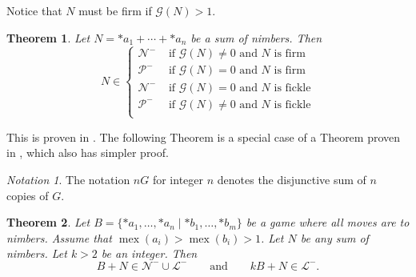 \documentclass{amsart}
\theoremstyle{plain}
\newtheorem{thm}{Theorem}
\theoremstyle{definition}
\theoremstyle{remark}
\newtheorem*{notn}{Notation}
\numberwithin{equation}{section}
\numberwithin{thm}{section}
\DeclareMathOperator{\mex}{mex}
\begin{document}
Notice that $N$ must be firm if $\mathcal{G}(N) > 1$.
\begin{thm}
    \label{nim_strategy}
    Let $N = *a_1 + \cdots +  *a_n $ be a sum of nimbers. Then \begin{equation*}
        N \in \begin{cases}
            \mathcal{N^-} & \text{ if } \mathcal{G}(N) \neq 0 \text{ and }N\text{ is firm} \\
             \mathcal{P^-} & \text{ if } \mathcal{G}(N) = 0 \text{ and }N\text{ is firm}  \\
              \mathcal{N^-} & \text{ if } \mathcal{G}(N)  = 0 \text{ and } N\text{ is fickle}\\
               \mathcal{P^-} & \text{ if } \mathcal{G}(N) \neq 0 \text{ and } N\text{ is fickle}\\
        \end{cases} 
        \end{equation*}
\end{thm}
  This is proven in  \cite[136]{conway2000numbers}.
The following Theorem is a special case of a Theorem proven in \cite{otherpaper}, which also has simpler proof.
\begin{notn}
    The notation $nG$ for integer $n$ denotes the disjunctive sum of $n$ copies of $G$.
\end{notn}
\begin{thm}
  \label{atomic_weight}
  Let $B = \{*a_1,\dots ,*a_n\mid *b_1,\dots,*b_m\}$ be a game where all moves are to nimbers. Assume that $\mex (a_i)  > \mex (b_i)>1$. Let $N$ be any sum of nimbers. Let $k>2$ be an integer. Then \[
    B + N \in \mathcal{N}^- \cup \mathcal{L}^-    
  \qquad\text{and}\qquad
      kB + N \in \mathcal{L}^-.
  \]
\end{thm}
\end{document}
